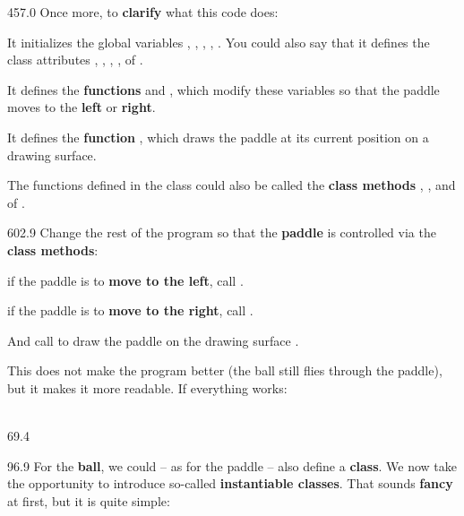 \documentclass{aslab}
\begin{document}
\begin{region}[pitch=13.8]{457.0}
Once more, to \textbf{clarify} what this code does:
\begin{dashlist}
\item It initializes the global variables , ,
  , , . You could also say that
  it defines the class attributes , , , ,
   of .
\item It defines the \textbf{functions}  and
  , which modify these variables so that the paddle
  moves to the \textbf{left} or \textbf{right}.
\item It defines the \textbf{function} , which draws the
  paddle at its current position on a drawing surface.
\item The functions defined in the class could also be called the
  \textbf{class methods} , , and  of
  .
\end{dashlist}
\end{region}

\begin{region}[pitch=13.62]{602.9}
Change the rest of the program so that the \textbf{paddle} is controlled
via the \textbf{class methods}:
\begin{dashlist}
\item if the paddle is to \textbf{move to the left}, call
  .
\item if the paddle is to \textbf{move to the right}, call
  .
\item And call  to draw the paddle on the drawing
  surface .
\end{dashlist}
This does not make the program better (the ball still flies through the
paddle), but it makes it more readable. If everything works:\\
\\
\end{region}

\nextpage
\begin{region}{69.4}
\end{region}

\begin{region}[pitch=14.25]{96.9}
For the \textbf{ball}, we could -- as for the paddle -- also define a
\textbf{class}. We now take the opportunity to introduce so-called
\textbf{instantiable classes}. That sounds \textbf{fancy} at first, but it is
quite simple:
\end{region}
\end{document}
